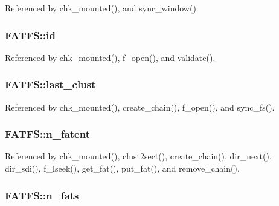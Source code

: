 Referenced by chk\-\_\-mounted(), and sync\-\_\-window().

\hypertarget{structFATFS_a417095d7c20d56d417dc0998e0dd5a5c}{
\subsubsection[{id}]{ F\-A\-T\-F\-S\-::id}}\label{structFATFS_a417095d7c20d56d417dc0998e0dd5a5c}


Referenced by chk\-\_\-mounted(), f\-\_\-open(), and validate().

\hypertarget{structFATFS_ad315def289218e26ab78ff90fde700d1}{
\subsubsection[{last\-\_\-clust}]{ F\-A\-T\-F\-S\-::last\-\_\-clust}}\label{structFATFS_ad315def289218e26ab78ff90fde700d1}


Referenced by chk\-\_\-mounted(), create\-\_\-chain(), f\-\_\-open(), and sync\-\_\-fs().

\hypertarget{structFATFS_a8da50eeba6469bc20d60ca0cf9a1307c}{
\subsubsection[{n\-\_\-fatent}]{ F\-A\-T\-F\-S\-::n\-\_\-fatent}}\label{structFATFS_a8da50eeba6469bc20d60ca0cf9a1307c}


Referenced by chk\-\_\-mounted(), clust2sect(), create\-\_\-chain(), dir\-\_\-next(), dir\-\_\-sdi(), f\-\_\-lseek(), get\-\_\-fat(), put\-\_\-fat(), and remove\-\_\-chain().

\hypertarget{structFATFS_a56716c7e7ac10cf46e73ffb2a2e9b545}{
\subsubsection[{n\-\_\-fats}]{ F\-A\-T\-F\-S\-::n\-\_\-fats}}\label{structFATFS_a56716c7e7ac10cf46e73ffb2a2e9b545}


